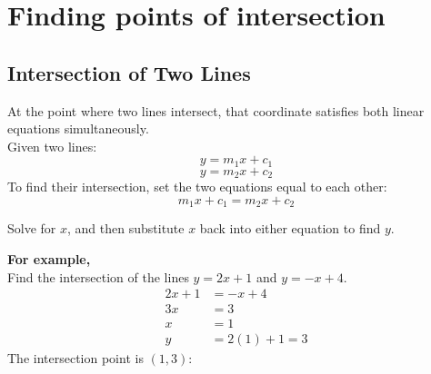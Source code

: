 \documentclass[12pt]{article}
\begin{document}
\begin{center}
\end{center}

\section*{Finding points of intersection }

\subsection*{Intersection of Two Lines}
At the point where two lines intersect, that coordinate satisfies both linear equations simultaneously.\\

Given two lines:
\[
y = m_1x + c_1
\]
\[
y = m_2x + c_2
\]
To find their intersection, set the two equations equal to each other:
\[
m_1x + c_1 = m_2x + c_2
\]

Solve for $x$, and then substitute \(x\) back into either equation to find \(y\).\\

\newpage

\textbf{For example,}\\

Find the intersection of the lines \( y = 2x + 1 \) and \( y = -x + 4 \).
\[
\begin{aligned}
2x + 1 &= -x + 4 \\
3x &= 3 \\
x &= 1 \\
y &= 2(1) + 1 = 3
\end{aligned}
\]
The intersection point is \( (1, 3) \):
\end{document}
